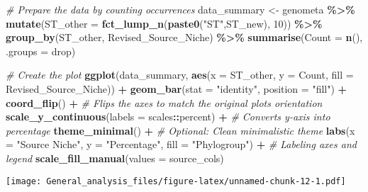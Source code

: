 \documentclass[
]{article}
\newenvironment{Shaded}{\begin{snugshade}}{\end{snugshade}}
\newcommand{\AttributeTok}[1]{\textcolor[rgb]{0.13,0.29,0.53}{#1}}
\newcommand{\CommentTok}[1]{\textcolor[rgb]{0.56,0.35,0.01}{\textit{#1}}}
\newcommand{\DecValTok}[1]{\textcolor[rgb]{0.00,0.00,0.81}{#1}}
\newcommand{\FunctionTok}[1]{\textcolor[rgb]{0.13,0.29,0.53}{\textbf{#1}}}
\newcommand{\NormalTok}[1]{#1}
\newcommand{\OtherTok}[1]{\textcolor[rgb]{0.56,0.35,0.01}{#1}}
\newcommand{\SpecialCharTok}[1]{\textcolor[rgb]{0.81,0.36,0.00}{\textbf{#1}}}
\newcommand{\StringTok}[1]{\textcolor[rgb]{0.31,0.60,0.02}{#1}}
\begin{document}
\begin{Shaded}
\begin{Highlighting}[]
\CommentTok{\# Prepare the data by counting occurrences}
\NormalTok{data\_summary }\OtherTok{\textless{}{-}}\NormalTok{ genometa }\SpecialCharTok{\%\textgreater{}\%}
  \FunctionTok{mutate}\NormalTok{(}\AttributeTok{ST\_other =} \FunctionTok{fct\_lump\_n}\NormalTok{(}\FunctionTok{paste0}\NormalTok{(}\StringTok{"ST"}\NormalTok{,ST\_new), }\DecValTok{10}\NormalTok{)) }\SpecialCharTok{\%\textgreater{}\%}
  \FunctionTok{group\_by}\NormalTok{(ST\_other, Revised\_Source\_Niche) }\SpecialCharTok{\%\textgreater{}\%}
  \FunctionTok{summarise}\NormalTok{(}\AttributeTok{Count =} \FunctionTok{n}\NormalTok{(), }\AttributeTok{.groups =} \StringTok{\textquotesingle{}drop\textquotesingle{}}\NormalTok{)}

\CommentTok{\# Create the plot}
\FunctionTok{ggplot}\NormalTok{(data\_summary, }\FunctionTok{aes}\NormalTok{(}\AttributeTok{x =}\NormalTok{ ST\_other, }\AttributeTok{y =}\NormalTok{ Count, }\AttributeTok{fill =}\NormalTok{ Revised\_Source\_Niche)) }\SpecialCharTok{+}
  \FunctionTok{geom\_bar}\NormalTok{(}\AttributeTok{stat =} \StringTok{"identity"}\NormalTok{, }\AttributeTok{position =} \StringTok{"fill"}\NormalTok{) }\SpecialCharTok{+}
  \FunctionTok{coord\_flip}\NormalTok{() }\SpecialCharTok{+}  \CommentTok{\# Flips the axes to match the original plot\textquotesingle{}s orientation}
  \FunctionTok{scale\_y\_continuous}\NormalTok{(}\AttributeTok{labels =}\NormalTok{ scales}\SpecialCharTok{::}\NormalTok{percent) }\SpecialCharTok{+}  \CommentTok{\# Converts y{-}axis into percentage}
  \FunctionTok{theme\_minimal}\NormalTok{() }\SpecialCharTok{+}  \CommentTok{\# Optional: Clean minimalistic theme}
  \FunctionTok{labs}\NormalTok{(}\AttributeTok{x =} \StringTok{"Source Niche"}\NormalTok{, }\AttributeTok{y =} \StringTok{"Percentage"}\NormalTok{, }\AttributeTok{fill =} \StringTok{"Phylogroup"}\NormalTok{) }\SpecialCharTok{+}  \CommentTok{\# Labeling axes and legend}
  \FunctionTok{scale\_fill\_manual}\NormalTok{(}\AttributeTok{values =}\NormalTok{ source\_cols)}
\end{Highlighting}
\end{Shaded}

\texttt{[image: General\_analysis\_files/figure-latex/unnamed-chunk-12-1.pdf]}
\end{document}
